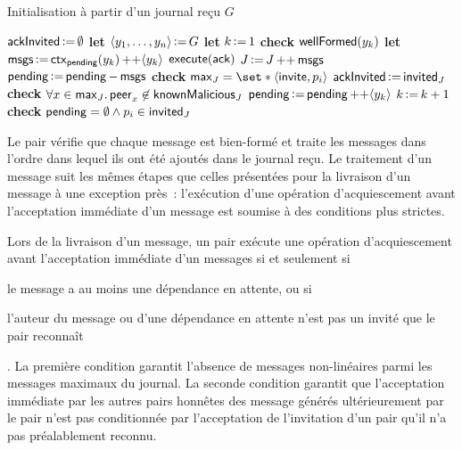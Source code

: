 \begin{algorithm}[ht]
\caption{Initialisation à partir d'un journal reçu $G$}\label{alg:full-log-init}
\begin{algorithmic}[1]
    \State $\trm{ackInvited} \assign \emptyset$
    \State \textbf{let} $\tuple*{y_1, \dotsc, y_n} \assign G$
    \State \textbf{let} $k \assign 1$
        \State \textbf{check} $\trm{wellFormed}(y_k)$
            \State \textbf{let} $\trm{msgs} \assign \trm{ctx}_{\trm{pending}}(y_k) \lappend \tuple*{y_k}$
                \State $\trm{execute}(\trm{ack})$
            \EndIf
            \State $J \assign J \lappend \trm{msgs}$
            \State $\trm{pending} \assign \trm{pending} \sminus \trm{msgs}$
                \State \textbf{check} $\trm{max}_J = \set*{\tuple*{\trm{invite}, p_i}}$
                \State $\trm{ackInvited} \assign \trm{invited}_J$
            \EndIf
            \State \textbf{check} $\forall x \in \trm{max}_J \qsep \trm{peer}_x \not\in \trm{knownMalicious}_J$
        \Else
            \State $\trm{pending} \assign \trm{pending} \lappend \tuple*{y_k}$
        \EndIf
        \State $k \assign k + 1$
    \EndWhile
    \State \textbf{check} $\trm{pending} = \emptyset \land p_i \in \trm{invited}_J$
\EndProcedure
\end{algorithmic}
\end{algorithm}

Le pair vérifie que chaque message est bien-formé et traite les messages dans l'ordre dans lequel ils ont été ajoutés dans le journal reçu.
Le traitement d'un message suit les mêmes étapes que celles présentées pour la livraison d'un message à une exception près~: l'exécution d'une opération d'acquiescement avant l'acceptation immédiate d'un message est soumise à des conditions plus strictes.

Lors de la livraison d'un message, un pair exécute une opération d'acquiescement avant l'acceptation immédiate d'un messages si et seulement si \begin{inlinelist}
\item le message a au moins une dépendance en attente, ou si
\item l'auteur du message ou d'une dépendance en attente n'est pas un invité que le pair reconnaît
\end{inlinelist}.
La première condition garantit l'absence de messages non-linéaires parmi les messages maximaux du journal.
La seconde condition garantit que l'acceptation immédiate par les autres pairs honnêtes des message générés ultérieurement par le pair n'est pas conditionnée par l'acceptation de l'invitation d'un pair qu'il n'a pas préalablement reconnu.

